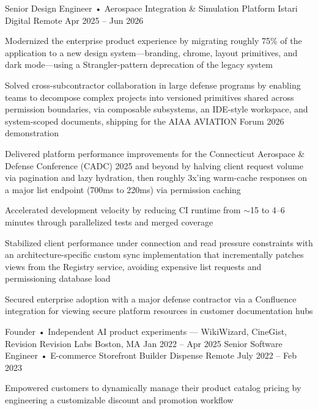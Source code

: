 \documentclass[]{awesome-cv}
\begin{document}
\begin{cventries}
	\cventry
	{Senior Design Engineer • Aerospace Integration \& Simulation Platform}
	{Istari Digital}
	{Remote}
	{Apr 2025 – Jun 2026}
	{\begin{cvitems}
		\item {Modernized the enterprise product experience by migrating roughly 75\% of the application to a new design system---branding, chrome, layout primitives, and dark mode---using a Strangler-pattern deprecation of the legacy system}
		\item {Solved cross-subcontractor collaboration in large defense programs by enabling teams to decompose complex projects into versioned primitives shared across permission boundaries, via composable subsystems, an IDE-style workspace, and system-scoped documents, shipping for the AIAA AVIATION Forum 2026 demonstration}
		\item {Delivered platform performance improvements for the Connecticut Aerospace \& Defense Conference (CADC) 2025 and beyond by halving client request volume via pagination and lazy hydration, then roughly 3x'ing warm-cache responses on a major list endpoint (700ms to 220ms) via permission caching}
		\item {Accelerated development velocity by reducing CI runtime from $\sim$15 to 4--6 minutes through parallelized tests and merged coverage}
		\item {Stabilized client performance under connection and read pressure constraints with an architecture-specific custom sync implementation that incrementally patches views from the Registry service, avoiding expensive list requests and permissioning database load}
		\item {Secured enterprise adoption with a major defense contractor via a Confluence integration for viewing secure platform resources in customer documentation hubs}
		\end{cvitems}}
	\cventry
	{Founder • Independent AI product experiments — WikiWizard, CineGist, Revision}
	{Revision Labs}
	{Boston, MA}
	{Jan 2022 – Apr 2025}
	{}
	\cventry
	{Senior Software Engineer • E-commerce Storefront Builder}
	{Dispense}
	{Remote}
	{July 2022 – Feb 2023}
	{\begin{cvitems}
		\item {Empowered customers to dynamically manage their product catalog pricing by engineering a customizable discount and promotion workflow}

\end{cvitems}}
\end{cventries}
\end{document}

